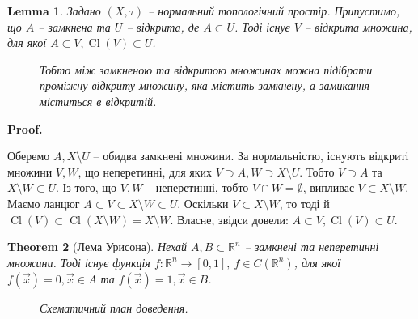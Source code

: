 \documentclass[a4paper, 10pt]{article}
\makeatletter
\def\qed{$\blacksquare$}
\theoremstyle{theoremdd}
\newtheorem{theorem}{Theorem}[subsection]
\theoremstyle{theoremdd}
\theoremstyle{theoremdd}
\theoremstyle{theoremdd}
\theoremstyle{theoremdd}
\theoremstyle{theoremdd}
\theoremstyle{theoremdd}
\theoremstyle{theoremdd}
\theoremstyle{theoremdd}
\theoremstyle{theoremdd}
\theoremstyle{theoremdd}
\theoremstyle{theoremdd}
\theoremstyle{theoremdd}
\newtheorem{lemma}[theorem]{Lemma}
\theoremstyle{theoremdd}
\theoremstyle{theoremdd}
\renewenvironment{proof}[1][Proof.\\]{\par
\pushQED{\hfill \qed}%
\normalfont \topsep6\p@\@plus6\p@\relax
\trivlist
\item\relax
{\bfseries
#1\@addpunct{.}}\hspace\labelsep\ignorespaces
}{%
\popQED\endtrivlist\@endpefalse
}
\DeclareMathOperator{\Cl}{Cl}
\makeatother
\begin{document}
\begin{lemma}
Задано $(X,\tau)$ -- нормальний топологічний простір. Припустимо, що $A$ -- замкнена та $U$ -- відкрита, де $A \subset U$. Тоді існує $V$ -- відкрита множина, для якої $A \subset V, \Cl(V) \subset U$.
\begin{figure}[H]
\centering
{}
\caption*{Тобто між замкненою та відкритою множинах можна підібрати проміжну відкриту множину, яка містить замкнену, а замикання міститься в відкритій.}
\end{figure}
\end{lemma}

\begin{proof}
Оберемо $A, X \setminus U$ -- обидва замкнені множини. За нормальністю, існують відкриті множини $V,W$, що неперетинні, для яких $V \supset A, W \supset X \setminus U$. Тобто $V \supset A$ та $X \setminus W \subset U$. Із того, що $V,W$ -- неперетинні, тобто $V \cap W = \emptyset$, випливає $V \subset X \setminus W$. Маємо ланцюг $A \subset V \subset X \setminus W \subset U$. Оскільки $V \subset X \setminus W$, то тоді й $\Cl(V) \subset \Cl(X \setminus W) = X \setminus W$. Власне, звідси довели: $A \subset V, \Cl(V) \subset U$.
\end{proof}

\begin{theorem}[Лема Урисона]
Нехай $A,B \subset \mathbb{R}^n$ -- замкнені та неперетинні множини. Тоді існує функція $f \colon \mathbb{R}^n \to [0,1],\ f \in C(\mathbb{R}^n)$, для якої $f(\vec{x}) = 0, \vec{x} \in A$ та $f(\vec{x}) = 1, \vec{x} \in B$.
\begin{figure}[H]
\centering
{}
\caption*{Схематичний план доведення.}
\end{figure}
\end{theorem}
\end{document}
